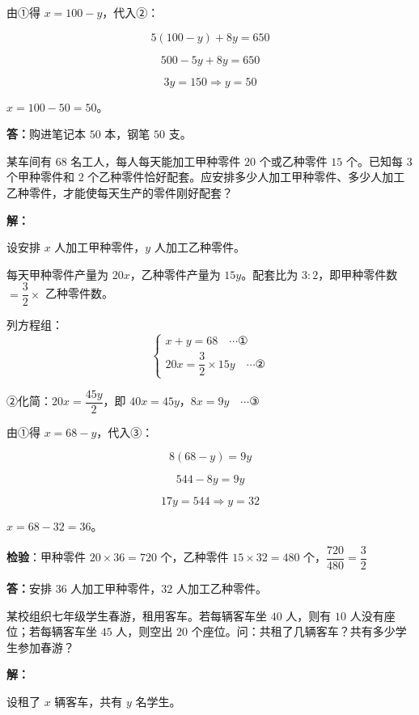 \documentclass[12pt, a4paper]{ctexart}
\begin{document}
由①得 $x = 100 - y$，代入②：

$$5(100 - y) + 8y = 650$$

$$500 - 5y + 8y = 650$$

$$3y = 150 \Rightarrow y = 50$$

$x = 100 - 50 = 50$。

\textbf{答：}购进笔记本 $50$ 本，钢笔 $50$ 支。

\bigskip

\begin{appbox}[【应用4】配套问题]
某车间有 $68$ 名工人，每人每天能加工甲种零件 $20$ 个或乙种零件 $15$ 个。已知每 $3$ 个甲种零件和 $2$ 个乙种零件恰好配套。应安排多少人加工甲种零件、多少人加工乙种零件，才能使每天生产的零件刚好配套？
\end{appbox}

\textbf{解：}

设安排 $x$ 人加工甲种零件，$y$ 人加工乙种零件。

每天甲种零件产量为 $20x$，乙种零件产量为 $15y$。配套比为 $3:2$，即甲种零件数 $= \dfrac{3}{2} \times$ 乙种零件数。

列方程组：
$$\begin{cases} x + y = 68 \quad \cdots ① \\ 20x = \dfrac{3}{2} \times 15y \quad \cdots ② \end{cases}$$

②化简：$20x = \dfrac{45y}{2}$，即 $40x = 45y$，$8x = 9y \quad \cdots ③$

由①得 $x = 68 - y$，代入③：

$$8(68 - y) = 9y$$

$$544 - 8y = 9y$$

$$17y = 544 \Rightarrow y = 32$$

$x = 68 - 32 = 36$。

\textbf{检验}：甲种零件 $20 \times 36 = 720$ 个，乙种零件 $15 \times 32 = 480$ 个，$\dfrac{720}{480} = \dfrac{3}{2}$ \quad \checkmark

\textbf{答：}安排 $36$ 人加工甲种零件，$32$ 人加工乙种零件。

\bigskip

\begin{appbox}[【应用5】方案设计问题]
某校组织七年级学生春游，租用客车。若每辆客车坐 $40$ 人，则有 $10$ 人没有座位；若每辆客车坐 $45$ 人，则空出 $20$ 个座位。问：共租了几辆客车？共有多少学生参加春游？
\end{appbox}

\textbf{解：}

设租了 $x$ 辆客车，共有 $y$ 名学生。
\end{document}
